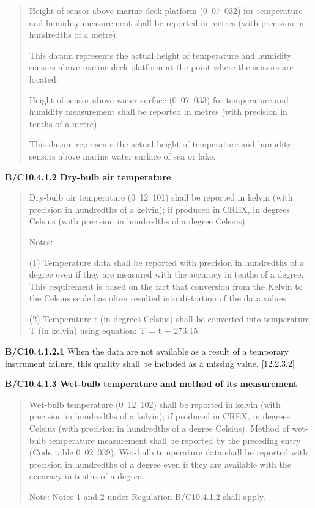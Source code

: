 \begin{quote}
Height of sensor above marine deck platform (0~07~032) for temperature and humidity measurement shall be reported in metres (with precision in hundredths of a metre).

This datum represents the actual height of temperature and humidity sensors above marine deck platform at the point where the sensors are located.

Height of sensor above water surface (0~07~033) for temperature and humidity measurement shall be reported in metres (with precision in tenths of a metre).

This datum represents the actual height of temperature and humidity sensors above marine water surface of sea or lake.
\end{quote}

\textbf{B/C10.4.1.2 Dry-bulb air temperature}

\begin{quote}
Dry-bulb air temperature (0~12~101) shall be reported in kelvin (with precision in hundredths of a kelvin); if produced in CREX, in degrees Celsius (with precision in hundredths of a degree Celsius).

Notes:

(1) Temperature data shall be reported with precision in hundredths of a degree even if they are measured with the accuracy in tenths of a degree. This requirement is based on the fact that conversion from the Kelvin to the Celsius scale has often resulted into distortion of the data values.

(2) Temperature t (in degrees Celsius) shall be converted into temperature T (in kelvin) using equation: T = t + 273.15.
\end{quote}

\textbf{B/C10.4.1.2.1} When the data are not available as a result of a temporary instrument failure, this quality shall be included as a missing value. {[}12.2.3.2{]}

\textbf{B/C10.4.1.3 Wet-bulb temperature and method of its measurement}

\begin{quote}
Wet-bulb temperature (0~12~102) shall be reported in kelvin (with precision in hundredths of a kelvin); if produced in CREX, in degrees Celsius (with precision in hundredths of a degree Celsius). Method of wet-bulb temperature measurement shall be reported by the preceding entry (Code table 0~02~039). Wet-bulb temperature data shall be reported with precision in hundredths of a degree even if they are available with the accuracy in tenths of a degree.

Note: Notes 1 and 2 under Regulation B/C10.4.1.2 shall apply.
\end{quote}

